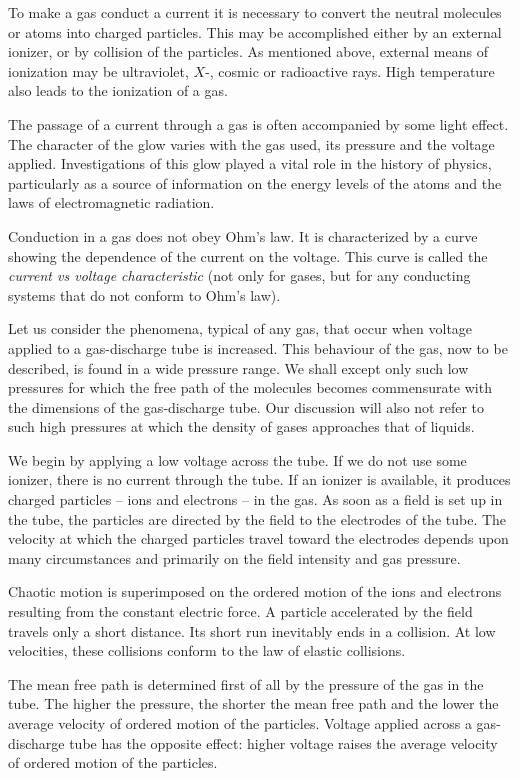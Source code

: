 To make a gas conduct a current it is necessary to convert the neutral molecules or atoms into charged particles. This may be accomplished either by an external ionizer, or by collision of the particles. As mentioned above, external means of ionization may be ultraviolet, $X$-, cosmic or radioactive rays. High temperature also leads to the ionization of a gas.

The passage of a current through a gas is often accompanied by some light effect. The character of the glow varies with the gas used, its pressure and the voltage applied. Investigations of this glow played a vital role in the history of physics, particularly as a source of information on the energy levels of the atoms and the
laws of electromagnetic radiation.

Conduction in a gas does not obey Ohm's law. It is characterized by a curve showing the dependence of the current on the voltage. This curve is called the \emph{current vs voltage characteristic} (not only for gases, but for any conducting systems that do not conform to Ohm's law).

Let us consider the phenomena, typical of any gas, that occur when voltage applied to a gas-discharge tube is increased. This behaviour of the gas, now to be described, is found in a wide pressure range. We shall except only such low pressures for which the free path of the molecules becomes commensurate with the dimensions of the gas-discharge tube. Our discussion will also not refer to such high pressures at which the density of gases approaches that of liquids.

We begin by applying a low voltage across the tube. If we do not use some ionizer, there is no current through the tube. If an ionizer is available, it produces charged particles -- ions and electrons -- in the gas. As soon as a field is set up in the tube, the particles are directed by the field to the electrodes of the tube. The velocity at which the charged particles travel toward the electrodes depends upon many circumstances and primarily on the field intensity and gas pressure.

Chaotic motion is superimposed on the ordered motion of the ions and electrons resulting from the constant electric force. A particle accelerated by the field travels only a short distance. Its short run inevitably ends in a collision. At low velocities, these collisions conform to the law of elastic collisions.

The mean free path is determined first of all by the pressure of the gas in the tube. The higher the pressure, the shorter the mean free path and the lower the average velocity of ordered motion of the particles. Voltage applied across a gas-discharge tube has the opposite effect: higher voltage raises the average velocity of ordered motion of the particles.

